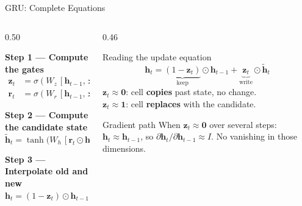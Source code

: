 \documentclass[aspectratio=169]{beamer}
\begin{document}
%
%
\begin{frame}{GRU: Complete Equations}
\begin{columns}[T]
\begin{column}{0.50\textwidth}

\textbf{Step 1 --- Compute the gates}
\begin{align*}
\bm{z}_t &= \sigma(W_z\,[\bm{h}_{t-1},\,\bm{x}_t] + \bm{b}_z) \\[4pt]
\bm{r}_t &= \sigma(W_r\,[\bm{h}_{t-1},\,\bm{x}_t] + \bm{b}_r)
\end{align*}

\smallskip
\textbf{Step 2 --- Compute the candidate state}
\[
\tilde{\bm{h}}_t = \tanh\!\bigl(W_h\,[\bm{r}_t \odot \bm{h}_{t-1},\;\bm{x}_t] + \bm{b}_h\bigr)
\]

\smallskip
\textbf{Step 3 --- Interpolate old and new}
\[
\bm{h}_t = (1 - \bm{z}_t) \odot \bm{h}_{t-1} + \bm{z}_t \odot \tilde{\bm{h}}_t
\]

\end{column}
\begin{column}{0.46\textwidth}
\begin{block}{Reading the update equation}
\[
\bm{h}_t =
\underbrace{(1-\bm{z}_t)}_{\text{keep}} \odot \bm{h}_{t-1}
+
\underbrace{\bm{z}_t}_{\text{write}} \odot \tilde{\bm{h}}_t
\]
$\bm{z}_t \approx \bm{0}$: cell \textbf{copies} past state, no change.\\[4pt]
$\bm{z}_t \approx \bm{1}$: cell \textbf{replaces} with the candidate.
\end{block}

\begin{alertblock}{Gradient path}
When $\bm{z}_t \approx \bm{0}$ over several steps:
$\bm{h}_t \approx \bm{h}_{t-1}$, so
$\partial \bm{h}_t / \partial \bm{h}_{t-1} \approx I$.
No vanishing in those dimensions.
\end{alertblock}
\end{column}
\end{columns}
\end{frame}
%
%
\end{document}
